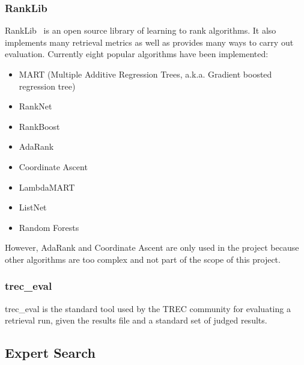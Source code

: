 \subsubsection{RankLib}\label{section:rankLib}
RankLib~\cite{ranklib} is an open source library of learning to rank algorithms. It also implements many retrieval metrics as well as provides many ways to carry out evaluation.
Currently eight popular algorithms have been implemented:
\begin{itemize}
 \item MART (Multiple Additive Regression Trees, a.k.a. Gradient boosted regression tree)
 \item RankNet
 \item RankBoost
 \item AdaRank
 \item Coordinate Ascent
 \item LambdaMART
 \item ListNet
 \item Random Forests
\end{itemize}

However, AdaRank and Coordinate Ascent are only used in the project because other algorithms are too complex and not part of the scope of this project.

\subsubsection{trec\_eval}
trec\_eval is the standard tool used by the TREC community for evaluating a retrieval run, given the results file and a
standard set of judged results. 

\subsection{Expert Search}
